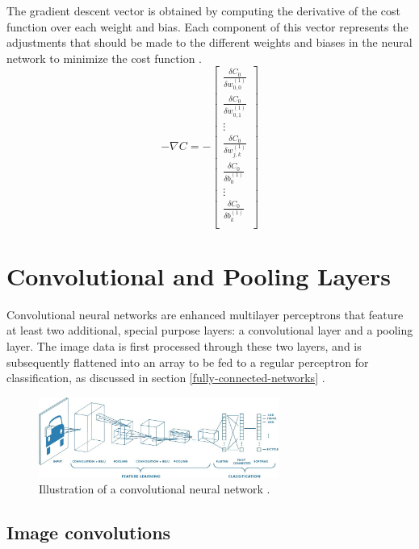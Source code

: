 ﻿\documentclass[12pt,a4paper,notitlepage]{article}
\begin{document}
The gradient descent vector is obtained by computing the derivative of the cost function over each weight and bias. Each component of this vector represents the adjustments that should be made to the different weights and biases in the neural network to minimize the cost function \cite{sanderson_backpropagation_2017}.
\begin{displaymath}
 -\nabla C =
 -\begin{bmatrix}
  \frac{\delta C_0}{\delta w_{0,0}^{(1)}}\\
  \frac{\delta C_0}{\delta w_{0,1}^{(1)}}\\
  \vdots\\
  \frac{\delta C_0}{\delta w_{j,k}^{(1)}}\\
  \frac{\delta C_0}{\delta b_{0}^{(1)}}\\
  \vdots\\
  \frac{\delta C_0}{\delta b_{k}^{(1)}}\\
 \end{bmatrix}
\end{displaymath}

\section{Convolutional and Pooling Layers}\label{cnn-section}
Convolutional neural networks are enhanced multilayer perceptrons that feature at least two additional, special purpose layers: a convolutional layer and a pooling layer. The image data is first processed through these two layers, and is subsequently flattened into an array to be fed to a regular perceptron for classification, as discussed in section \ref{fully-connected-networks} \cite{saha_comprehensive_2018}.

\begin{figure}[htbp]
 \centering
  \includegraphics[width=0.70\textwidth]{images/convolutional-neural-network.jpeg}
 \caption{Illustration of a convolutional neural network \cite{saha_comprehensive_2018}.}
 \label{fig:convolutional-neural-network}
\end{figure}
\subsection{Image convolutions}
\end{document}
